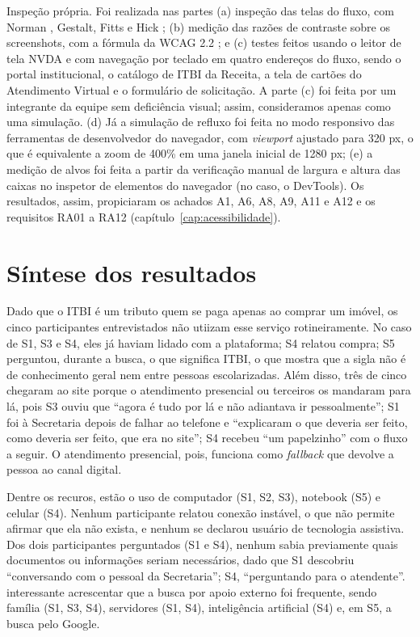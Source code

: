 \documentclass[
  12pt,
  oneside,
  a4paper,
  chapter=TITLE,
  section=TITLE,
  english,
  brazilian
]{abntex2}
\begin{document}
Inspeção própria. Foi realizada nas partes (a) inspeção das telas do fluxo, com Norman \cite{norman2013}, Gestalt,
Fitts \cite{fitts1954} e Hick \cite{hick1952}; (b) medição das razões de
contraste sobre os screenshots, com a fórmula da WCAG 2.2 \cite{wcag22}; e (c) testes feitos usando o leitor de tela NVDA e com navegação por teclado em quatro endereços do fluxo, sendo o portal
institucional, o catálogo de ITBI da Receita, a tela de cartões do Atendimento
Virtual e o formulário de solicitação. A parte (c) foi feita por um integrante da equipe sem deficiência visual; assim, consideramos apenas como uma simulação. (d) Já a simulação de refluxo
foi feita no modo responsivo das ferramentas de desenvolvedor do navegador, com
\textit{viewport} ajustado para 320 px, o que é equivalente a zoom de 400\% em
uma janela inicial de 1280 px; (e) a medição de alvos foi feita a partir da verificação
manual de largura e altura das caixas no inspetor de elementos do
navegador (no caso, o DevTools). Os resultados, assim, propiciaram os achados A1, A6, A8, A9, A11 e A12 e os
requisitos RA01 a RA12 (capítulo~\ref{cap:acessibilidade}).

\section{Síntese dos resultados}\label{sec:sintese}

Dado que o ITBI é um tributo quem se paga apenas ao comprar um imóvel, os cinco participantes entrevistados
não utiizam esse serviço rotineiramente. No caso de S1, S3 e S4, eles já haviam lidado com a plataforma;
S4 relatou compra; S5 perguntou, durante a
busca, o que significa ITBI, o que mostra que a sigla não é de conhecimento
geral nem entre pessoas escolarizadas. Além disso, três de cinco chegaram ao site porque o
atendimento presencial ou terceiros os mandaram para lá, pois S3 ouviu que ``agora é
tudo por lá e não adiantava ir pessoalmente''; S1 foi à Secretaria depois de
falhar ao telefone e ``explicaram o que deveria ser feito, como deveria ser
feito, que era no site''; S4 recebeu ``um papelzinho'' com o fluxo a seguir. O
atendimento presencial, pois, funciona como \textit{fallback} que devolve a
pessoa ao canal digital.

Dentre os recuros, estão o uso de computador (S1, S2, S3), notebook (S5) e celular (S4).
Nenhum participante relatou conexão instável, o que não permite afirmar que ela
não exista, e nenhum se declarou usuário de tecnologia assistiva. Dos dois
participantes perguntados (S1 e S4), nenhum sabia previamente quais
documentos ou informações seriam necessários, dado que S1 descobriu ``conversando com o
pessoal da Secretaria''; S4, ``perguntando para o atendente''. interessante acrescentar que a busca por apoio externo foi frequente, sendo família (S1, S3, S4), servidores (S1,
S4), inteligência artificial (S4) e, em S5, a busca pelo Google.
\end{document}
